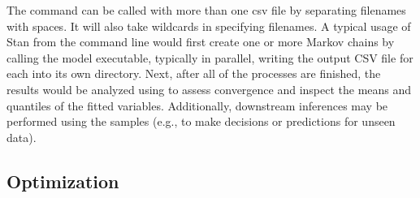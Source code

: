 The command  can be called with more than one csv file
by separating filenames with spaces. It will also take wildcards in
specifying filenames. A typical usage of Stan from the command line
would first create one or more Markov chains by calling the model
executable, typically in parallel, writing the output CSV file for
each into its own directory.  Next, after all of the processes are
finished, the results would be analyzed using  to assess
convergence and inspect the means and quantiles of the fitted
variables.  Additionally, downstream inferences may be performed using
the samples (e.g., to make decisions or predictions for unseen data).

\subsection{Optimization}

